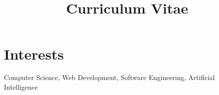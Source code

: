 \documentclass[11pt,a4paper,sans]{moderncv} %
\title{Curriculum Vitae}
\begin{document}











\makecvtitle %




\section{Interests}
Computer Science,
Web Development,
Software Engineering,
Artificial Intelligence


\end{document}
